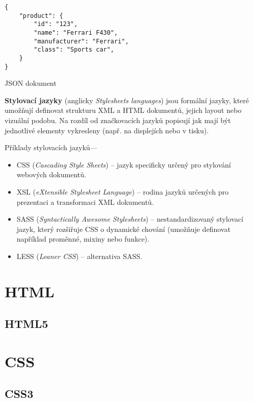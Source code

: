 \begin{example}
    \centering
    \begin{lstlisting}
{
    "product": {
        "id": "123",
        "name": "Ferrari F430",
        "manufacturer": "Ferrari",
        "class": "Sports car",
    }
}
    \end{lstlisting}
    \caption{JSON dokument}
    \label{example:json}
\end{example}

\textbf{Stylovací jazyky} (anglicky \textit{Stylesheets languages}) jsou formální jazyky, které umožňují definovat strukturu XML a HTML dokumentů, jejich layout nebo vizuální podobu. Na rozdíl od značkovacích jazyků popisují jak mají být jednotlivé elementy vykresleny (např. na displejích nebo v tisku).

Příklady stylovacích jazyků---

\begin{itemize}
    \item CSS (\textit{Cascading Style Sheets}) -- jazyk specificky určený pro stylování webových dokumentů.
    \item XSL (\textit{eXtensible Stylesheet Language}) -- rodina jazyků určených pro prezentaci a transformaci XML dokumentů.
    \item SASS (\textit{Syntactically Awesome Stylesheets}) -- nestandardizovaný stylovací jazyk, který rozšiřuje CSS o dynamické chování (umožňuje definovat například proměnné, mixiny nebo funkce).
    \item LESS (\textit{Leaner CSS}) -- alternativa SASS.
\end{itemize}

\section{HTML}
\label{sec:html}

\subsection{HTML5}

\section{CSS}
\label{sec:css}

\subsection{CSS3}


